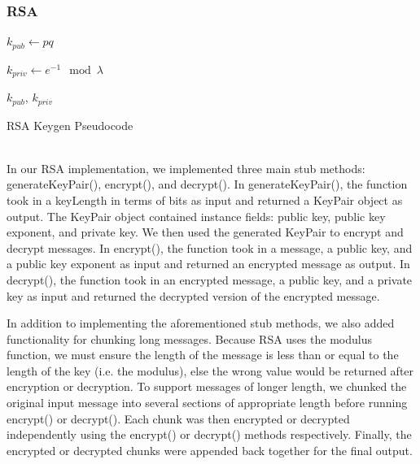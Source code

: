 \documentclass[acmlarge]{acmart}
\begin{document}
\subsubsection{RSA}\label{sec:rsa}
\begin{algorithm}[tbh]
\SetAlgoNoLine
{}


$k_{pub} \longleftarrow pq$

$k_{priv} \longleftarrow e^{-1} \mod{\lambda}$

\KwRet $k_{pub}$, $k_{priv}$
\caption{RSA Keygen Pseudocode \cite{RSA}}
\label{alg:rsa-keygen}
\end{algorithm}
\hspace*{\fill} \\ %
In our RSA implementation, we implemented three main stub methods: generateKeyPair(), encrypt(), and decrypt(). In generateKeyPair(), the function took in a keyLength in terms of bits as input and returned a KeyPair object as output. The KeyPair object contained instance fields: public key, public key exponent, and private key. We then used the generated KeyPair to encrypt and decrypt messages. In encrypt(), the function took in a message, a public key, and a public key exponent as input and returned an encrypted message as output. In decrypt(), the function took in an encrypted message, a public key, and a private key as input and returned the decrypted version of the encrypted message.

In addition to implementing the aforementioned stub methods, we also added functionality for chunking long messages. Because RSA uses the modulus function, we must ensure the length of the message is less than or equal to the length of the key (i.e. the modulus), else the wrong value would be returned after encryption or decryption. To support messages of longer length, we chunked the original input message into several sections of appropriate length before running encrypt() or decrypt(). Each chunk was then encrypted or decrypted independently using the encrypt() or decrypt() methods respectively. Finally, the encrypted or decrypted chunks were appended back together for the final output.
\end{document}
